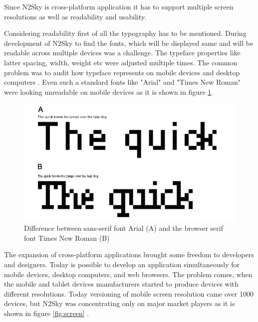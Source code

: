 Since N2Sky is cross-platform application it has to support multiple screen resolutions as well as readability and usability. 

Considering readability first of all the typography has to be mentioned. During development of N2Sky to find the fonts, which will be displayed same and will be readable across multiple devices was a challenge. The typeface \cite{wiki:typeface} properties like latter spacing, width, weight etc were adjusted multiple times. The common problem was to audit how typeface represents on mobile devices and desktop computers \cite{responsive_book}. Even such a standard fonts like "Arial" and "Times New Roman" were looking unreadable on mobile devices as it is shown in figure \ref{fig:typo}.

\begin{figure}[htbp]
\begin{center}
  \includegraphics[scale=0.5]{components/3/components/typo.png}
  \caption{Difference between sans-serif font Arial (A) and the browser serif font Times New Roman (B) }
  \label{fig:typo}
\end{center}
\end{figure}

The expansion of cross-platform applications brought some freedom to developers and designers. Today is possible to develop an application simultaneously for mobile devices, desktop computers, and web browsers. The problem comes, when the mobile and tablet devices manufacturers started to produce devices with different resolutions. Today versioning of mobile screen resolution came over 1000 devices, but N2Sky was concentrating only on major market players as it is shown in figure \ref{fig:screen} \cite{mobile_resolution}.

